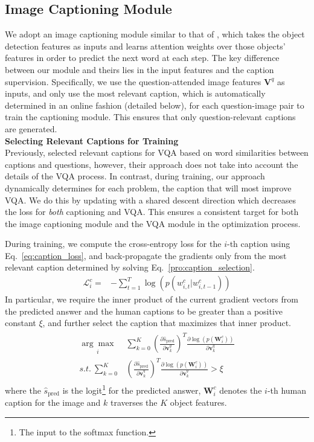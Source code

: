 \documentclass[11pt,a4paper]{article}
\begin{document}
\subsection{Image Captioning Module}
\label{sec:ic}
We adopt an image captioning module similar to that of , which takes the object detection features as inputs and learns attention weights over those objects' features in order to predict the next word at each step. The key difference between our module and theirs lies in the input features and the caption supervision. Specifically, we use the question-attended image features $\textbf{V}^q$ as inputs, and only use the most relevant caption, which is automatically determined in an online fashion (detailed below), for each question-image pair to train the captioning module. This ensures that only question-relevant captions are generated.\\

\noindent\textbf{Selecting Relevant Captions for Training}\\
 Previously,  selected relevant captions for VQA based on word similarities between captions and questions, however, their approach does not take into account the details of the VQA process. In contrast, during training, our approach dynamically determines for each problem, the caption that will most improve VQA.  
We do this by updating with a shared descent direction \cite{wu2018dynamic} which decreases the loss for {\it both} captioning and VQA. This ensures a consistent target for both the image captioning module and the VQA module in the optimization process.

During training, we compute the cross-entropy loss for the $i$-th caption using Eq.\ \ref{eq:caption_loss}, and back-propagate the gradients only from the most relevant caption determined by solving Eq.\ \ref{pro:caption_selection}. 
\begin{align}
    \mathcal{L}^c_{i} =& -\sum^T_{t=1}\log(p(w^{c}_{i,t}|w^c_{i,t-1}))
    \label{eq:caption_loss}
    \end{align}
In particular, we require the inner product of the current gradient vectors from the predicted answer and the human captions to be greater than a positive constant $\xi$, and further select the caption that maximizes that inner product. 
\begin{align}
\begin{split}
    \underset{i}{\arg \max}& \sum_{k=0}^{K}  \left( \frac{\partial \hat{s}_{\text{pred}}}{\partial \textbf{v}^{q}_k}\right) ^T\frac{\partial \log (p(\textbf{W}^{c}_i))}{\partial \textbf{v}^{q}_k} \\
s.t.~\sum_{k=0}^{K} & \left( \frac{\partial \hat{s}_{\text{pred}} }{\partial \textbf{v}^{q}_k}\right) ^T\frac{\partial \log (p(\textbf{W}^{c}_i))}{\partial \textbf{v}^{q}_k} > \xi 
    \label{pro:caption_selection}
\end{split}
\end{align}
where the $\hat{s}_{\text{pred}}$ is the logit\footnote{The input to the softmax function.} for the predicted answer, $\textbf{W}^{c}_i$ denotes the $i$-th human caption for the image and $k$ traverses the $K$ object features.
\end{document}
